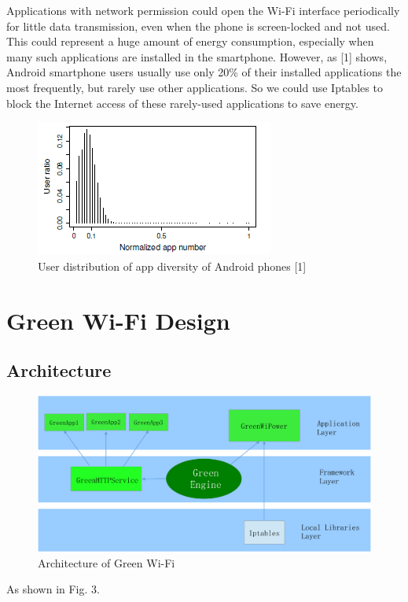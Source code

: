 \documentclass[journal]{IEEEtran}
\begin{document}
Applications with network permission could open the Wi-Fi interface periodically for little data transmission, even when the phone is screen-locked and not used. This could represent a huge amount of energy consumption, especially when many such applications are installed in the smartphone.
However, as [1] shows, Android smartphone users usually use only 20\% of their installed applications the most frequently, but rarely use other applications.
So we could use Iptables to block the Internet access of these rarely-used applications to save energy.

\begin{figure}
\centering
\includegraphics[scale=0.95]{application_utilisation_android.png}
\caption{User distribution of app diversity of Android phones [1]}
\label{architecture}
\end{figure}

\section{Green Wi-Fi Design}

\subsection{Architecture}
\begin{figure}
\centering
\includegraphics[scale=0.35]{architecture.pdf}
\caption{Architecture of Green Wi-Fi}
\label{architecture}
\end{figure}
As shown in Fig. 3.
\end{document}
